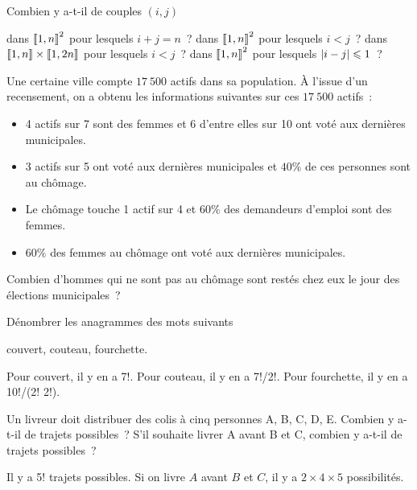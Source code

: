 \documentclass{magnolia}
\begin{document}
Combien y a-t-il de couples $(i,j)$
\begin{questions}
\question dans $\left\llbracket 1,n\right\rrbracket^2$ pour lesquels $i+j=n$~?
\question dans $\left\llbracket 1,n\right\rrbracket^2$ pour lesquels $i<j$~?
\question dans $\left\llbracket 1,n\right\rrbracket\times\left\llbracket 1,2n\right\rrbracket$ pour lesquels $i<j$~?
\question dans $\left\llbracket 1,n\right\rrbracket^2$ pour lesquels $\left|i-j\right|\leqslant 1$~?
\end{questions}

Une certaine ville compte $17\ 500$ actifs dans sa population. À l'issue
d'un recensement, on a obtenu les informations suivantes sur ces $17\ 500$
actifs~:
\begin{itemize}
\item 4 actifs sur 7 sont des femmes et 6 d'entre elles sur 10 ont voté
  aux dernières municipales.
\item 3 actifs sur 5 ont voté aux dernières municipales et $40 \%$ de ces
  personnes sont au chômage.
\item Le chômage touche 1 actif sur 4 et $60 \%$ des demandeurs d'emploi
  sont des femmes.
\item $60 \%$ des femmes au chômage ont voté aux dernières municipales.
\end{itemize}
Combien d'hommes qui ne sont pas au chômage sont restés chez eux le jour des
élections municipales~?






Dénombrer les anagrammes des mots suivants
\begin{center}
{\sc couvert, couteau, fourchette}.
\end{center}
\begin{sol}
Pour couvert, il y en a 7!. Pour couteau, il y en a 7!/2!. Pour fourchette, il
y en a 10!/(2! 2!).
\end{sol}

Un livreur doit distribuer des colis à cinq personnes A, B, C, D, E. Combien y
a-t-il de trajets possibles~? S'il souhaite livrer A avant B et C, combien
y a-t-il de trajets possibles~?
\begin{sol}
Il y a 5! trajets possibles. Si on livre $A$ avant $B$ et $C$, il y a
$2\times 4\times 5$ possibilités.
\end{sol}
\end{document}
